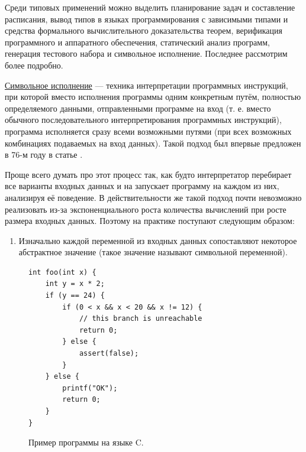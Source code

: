 Среди типовых применений можно выделить планирование задач и составление расписания, вывод типов в языках программирования с зависимыми типами и средства формального вычислительного доказательства теорем, верификация программного и аппаратного обеспечения, статический анализ программ, генерация тестового набора и символьное исполнение. Последнее рассмотрим более подробно.


\underline{Символьное исполнение} --- техника интерпретации программных инструкций, при которой вместо исполнения программы одним конкретным путём, полностью определяемого данными, отправленными программе на вход (т. е. вместо обычного последовательного интерпретирования программных инструкций), программа исполняется сразу всеми возможными путями (при всех возможных комбинациях подаваемых на вход данных). Такой подход был впервые предложен в 76-м году в статье \cite{symbex-intro-paper}.

Проще всего думать про этот процесс так, как будто интерпретатор перебирает все варианты входных данных и на запускает программу на каждом из них, анализируя её поведение. В действительности же такой подход почти невозможно реализовать из-за экспоненциального роста количества вычислений при росте размера входных данных. Поэтому на практике поступают следующим образом:

\begin{enumerate}
    \item Изначально каждой переменной из входных данных сопоставляют некоторое абстрактное значение (такое значение называют символьной переменной).
\end{enumerate}


\begin{figure}[ht]
\begin{center}
\begin{minipage}{0.5\textwidth}
\begin{verbatim}
int foo(int x) {
    int y = x * 2;
    if (y == 24) {
        if (0 < x && x < 20 && x != 12) {
            // this branch is unreachable
            return 0;
        } else {
            assert(false);
        }
    } else {
        printf("OK");
        return 0;
    }
}
\end{verbatim}
\caption{\label{symbex-example} Пример программы на языке C.}
\end{minipage}
\end{center}
\end{figure}

